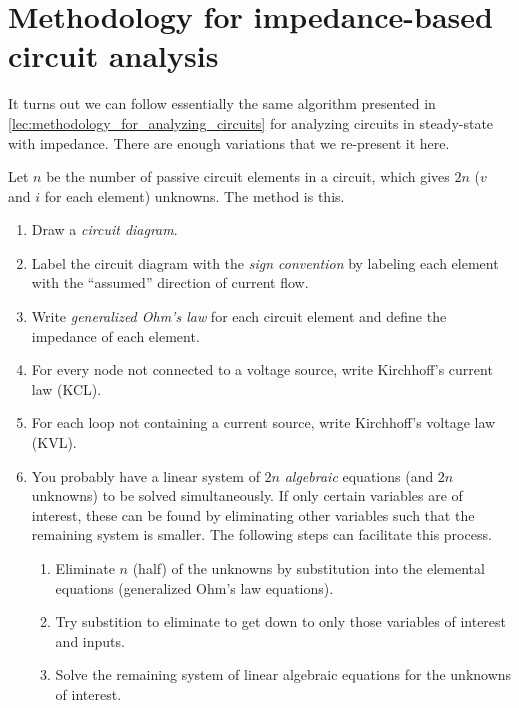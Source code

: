 \documentclass[electronics.tex]{subfiles}
\begin{document}
\section{Methodology for impedance-based circuit analysis}
\tags{}

It turns out we can follow essentially the same algorithm presented in \autoref{lec:methodology_for_analyzing_circuits} for analyzing circuits in steady-state with impedance. There are enough variations that we re-present it here.
\tags{}

Let $n$ be the number of passive circuit elements in a circuit, which gives $2n$ ($v$ and $i$ for each element) unknowns. The method is this.
\tags{}

\begin{enumerate}
	\item Draw a \emph{circuit diagram}.
	\item Label the circuit diagram with the \emph{sign convention} by labeling each element with the ``assumed'' direction of current flow.
	\item Write \emph{generalized Ohm's law} for each circuit element and define the impedance of each element.
	\item For every node not connected to a voltage source, write Kirchhoff's current law (KCL).
	\item For each loop not containing a current source, write Kirchhoff's voltage law (KVL).
	\item You probably have a linear system of $2 n$ \emph{algebraic} equations (and $2 n$ unknowns) to be solved simultaneously. If only certain variables are of interest, these can be found by eliminating other variables such that the remaining system is smaller. The following steps can facilitate this process.
	\begin{enumerate}
		\item Eliminate $n$ (half) of the unknowns by substitution into the elemental equations (generalized Ohm's law equations).
		\item Try substition to eliminate to get down to only those variables of interest and inputs.
		\item Solve the remaining system of linear algebraic equations for the unknowns of interest.
	\end{enumerate}
\end{enumerate}
\end{document}
